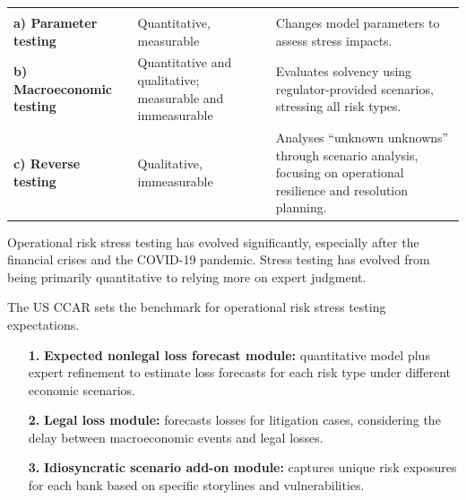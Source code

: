 
\noindent\begin{minipage}{\textwidth}
\renewcommand{\arraystretch}{1.35}
\begin{tabularx}{\textwidth}{@{}L{0.20\textwidth}L{0.24\textwidth}Y@{}}
  &  & \\
{\tabfont \textbf{a) Parameter testing}} & {\tabfont Quantitative, measurable} &
{\tabfont Changes model parameters to assess stress impacts.}\\
{\tabfont \textbf{b) Macroeconomic testing}} & {\tabfont Quantitative and qualitative; measurable and immeasurable} &
{\tabfont Evaluates solvency using regulator-provided scenarios, stressing all risk types.}\\
{\tabfont \textbf{c) Reverse testing}} & {\tabfont Qualitative, immeasurable} &
{\tabfont Analyses ``unknown unknowns'' through scenario analysis, focusing on operational resilience and resolution planning.}\\
\end{tabularx}
\end{minipage}



Operational risk stress testing has evolved significantly, especially after the
financial crises and the COVID-19 pandemic. Stress testing has evolved from being
primarily quantitative to relying more on expert judgment.

The US CCAR sets the benchmark for operational risk stress testing expectations.

\begin{enumerate}
\item[\textcolor{rust}{\sffamily\bfseries 1.}] \textbf{Expected nonlegal loss
forecast module:} quantitative model plus expert refinement to estimate loss
forecasts for each risk type under different economic scenarios.
\item[\textcolor{rust}{\sffamily\bfseries 2.}] \textbf{Legal loss module:}
forecasts losses for litigation cases, considering the delay between
macroeconomic events and legal losses.
\item[\textcolor{rust}{\sffamily\bfseries 3.}] \textbf{Idiosyncratic scenario
add-on module:} captures unique risk exposures for each bank based on specific
storylines and vulnerabilities.
\end{enumerate}

